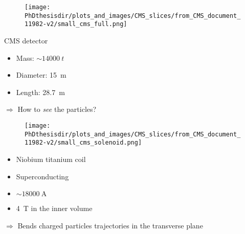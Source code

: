\begin{frame}
\begin{minipage}[t]{.6\textwidth}
\begin{figure}
\texttt{[image: \\PhDthesisdir/plots\_and\_images/CMS\_slices/from\_CMS\_document\_11982-v2/small\_cms\_full.png]}
\end{figure}
\end{minipage}
\hfill\begin{minipage}[t]{.35\textwidth}
\begin{block}{CMS detector}
\begin{itemize}
\item Mass: $\sim\SI{14000}{t}$
\item Diameter: \SI{15}{\meter}
\item Length: \SI{28.7}{\meter}
\end{itemize}
\end{block}

\begin{block}{}
$\Rightarrow$ How to \emph{see} the particles?
\end{block}
\end{minipage}
\end{frame}

\begin{frame}
\addtocounter{framenumber}{-1}
\begin{minipage}[t]{.6\textwidth}
\begin{figure}
\texttt{[image: \\PhDthesisdir/plots\_and\_images/CMS\_slices/from\_CMS\_document\_11982-v2/small\_cms\_solenoid.png]}
\end{figure}
\end{minipage}
\hfill\begin{minipage}[t]{.35\textwidth}
\begin{block}{}
\begin{itemize}
\item Niobium titanium coil
\item Superconducting
\item $\sim\SI{18000}{\ampere}$
\item \SI{4}{\tesla} in the inner volume
\end{itemize}
\end{block}

\begin{block}{}
$\Rightarrow$ Bends charged particles trajectories in the transverse plane
\end{block}
\end{minipage}

\end{frame}

